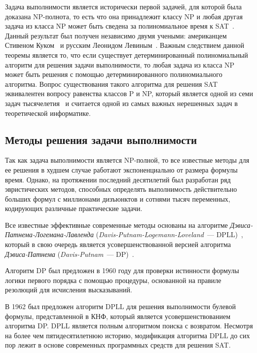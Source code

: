 Задача выполнимости является исторически первой задачей, для которой была доказана NP-полнота, то есть что она принадлежит классу NP и любая другая задача из класса NP может быть сведена за полиномиальное время к SAT~\cite{reduce-ladner-75}.
Данный результат был получен независимо двумя учеными: американцем Стивеном Куком~\cite{cook-satnp-71} и русским Леонидом Левиным~\cite{levin-satnp-73}.
Важным следствием данной теоремы является то, что если существует детерминированный полиномиальный алгоритм для решения задачи выполнимости, то любая задача из класса NP может быть решения с помощью детерминированного полиномиального алгоритма.
Вопрос существования такого алгоритма для решения SAT эквивалентен вопросу равенства классов P и NP, который является одной из семи задач тысячелетия~\cite{millennium-problems-carlson-06} и считается одной из самых важных нерешенных задач в теоретической информатике.

\subsection{Методы решения задачи выполнимости}
\label{sec:review:sat:methods}

Так как задача выполнимости является NP-полной, то все известные методы для ее решения в худшем случае работают экспоненциально от размера формулы время.
Однако, на протяжении последний десятилетий был разработан ряд эвристических методов, способных определять выполнимость действительно больших формул с миллионами дизъюнктов и сотнями тысяч переменных, кодирующих различные практические задачи.

Все известные эффективные современные методы основаны на алгоритме \emph{Дэвиса-Патнема-Логемана-Лавленда} (\emph{Davis-Putnam-Logemann-Loveland}~--- DPLL)~\cite{DBLP:journals/cacm/DavisLL62}, который в свою очередь является усовершенствованной версией алгоритма \emph{Дэвиса-Патнема} (\emph{Davis-Putnam}~--- DP)~\cite{DBLP:journals/jacm/DavisP60}.

Алгоритм DP был предложен в 1960 году для проверки истинности формулы логики первого порядка с помощью процедуры, основанной на правиле резолюций для исчисления высказываний.

В 1962 был предложен алгоритм DPLL для решения выполнимости булевой формулы, представленной в КНФ, который является усовершенствованием алгоритма DP.
DPLL является полным алгоритмом поиска с возвратом. 
Несмотря на более чем пятидесятилетнюю историю, модификация алгоритма DPLL до сих пор лежит в основе современных программных средств для решения SAT.

